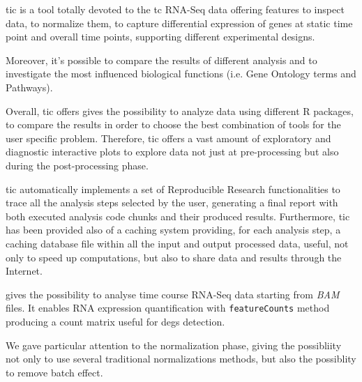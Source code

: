 \gls{tic} is a tool totally devoted to the \gls{tc} RNA-Seq data offering features to inspect data, to normalize them, to capture differential expression of genes at static time point and overall time points, supporting different experimental designs.

Moreover, it's possible to compare the results of different analysis and to investigate the most influenced biological functions (i.e. Gene Ontology terms and Pathways). 

Overall, \gls{tic} offers gives the possibility to analyze data using different R packages, to compare the results in order to choose the best combination of tools for the user specific problem. Therefore, \gls{tic} offers a vast amount of exploratory and diagnostic interactive plots to explore data not just at pre-processing but also during the post-processing phase. 

\gls{tic} automatically implements a set of Reproducible Research functionalities to trace all the analysis steps selected by the user, generating a final report with both executed analysis code chunks and their produced results. Furthermore, \gls{tic} has been provided also of a caching system providing, for each analysis step, a caching database file within all the input and output processed data, useful, not only to speed up computations, but also to share data and results through the Internet.




gives the possibility to analyse time course RNA-Seq data starting from \textit{BAM} files.
It enables RNA expression quantification with \lstinline!featureCounts! method producing a count matrix useful for \glspl{deg} detection.

We gave particular attention to the normalization phase, giving the possibliity not only to use several traditional normalizations methods, but also the possiblity to remove batch effect.



